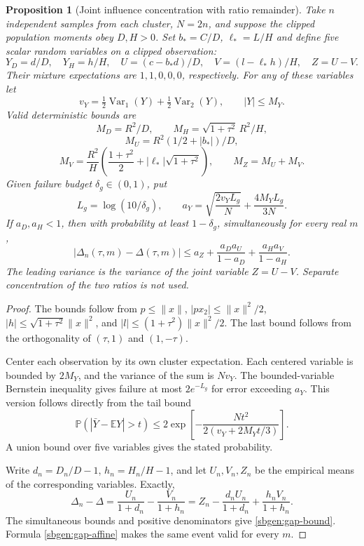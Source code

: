 \documentclass{article} %
\theoremstyle{plain}
\newtheorem{proposition}[theorem]{Proposition}
\theoremstyle{definition}
\theoremstyle{remark}
\begin{document}
\begin{proposition}[Joint influence concentration with ratio remainder]
\label{sbgen:joint-gap}
Take $n$ independent samples from each cluster, $N=2n$, and suppose the
clipped population moments obey $D,H>0$. Set $b_*=C/D$, $\ell_*=L/H$ and
define five scalar random variables on a clipped observation:
\[
 Y_D=d/D,\quad Y_H=h/H,\quad
 U=(c-b_*d)/D,\quad V=(l-\ell_*h)/H,\quad Z=U-V.
\]
Their mixture expectations are $1,1,0,0,0$, respectively. For any of
these variables let
\[
 v_Y=\tfrac12\operatorname{Var}_1(Y)+\tfrac12\operatorname{Var}_2(Y),
 \qquad |Y|\le M_Y.
\]
Valid deterministic bounds are
\[
 M_D=R^2/D,\qquad M_H=\sqrt{1+\tau^2}\,R^2/H,
\]
\[
 M_U=R^2(1/2+|b_*|)/D,
\]
\[
 M_V=\frac{R^2}{H}
       \left(\frac{1+\tau^2}{2}+|\ell_*|\sqrt{1+\tau^2}\right),
 \qquad M_Z=M_U+M_V.
\]
Given failure budget $\delta_g\in(0,1)$, put
\[
 L_g=\log(10/\delta_g),\qquad
 a_Y=\sqrt{\frac{2v_YL_g}{N}}+\frac{4M_YL_g}{3N}.
\]
If $a_D,a_H<1$, then with probability at least $1-\delta_g$,
simultaneously for every real $m$,
\begin{equation}\label{sbgen:gap-bound}
 |\Delta_n(\tau,m)-\Delta(\tau,m)|
 \le a_Z+\frac{a_Da_U}{1-a_D}+\frac{a_Ha_V}{1-a_H}.
\end{equation}
The leading variance is the variance of the \emph{joint} variable
$Z=U-V$. Separate concentration of the two ratios is not used.
\end{proposition}
\begin{proof}
The bounds follow from $p\le\|x\|$, $|px_2|\le\|x\|^2/2$,
$|h|\le\sqrt{1+\tau^2}\|x\|^2$, and
$|l|\le(1+\tau^2)\|x\|^2/2$. The last bound follows from the
orthogonality of $(\tau,1)$ and $(1,-\tau)$.

Center each observation by its own cluster expectation. Each centered
variable is bounded by $2M_Y$, and the variance of the sum is $Nv_Y$.
The bounded-variable Bernstein inequality gives failure at most
$2e^{-L_g}$ for error exceeding $a_Y$. This version follows directly
from the tail bound
\[
 \mathbb P(|\bar Y-\mathbb EY|>t)
 \le2\exp\left[-\frac{Nt^2}{2(v_Y+2M_Yt/3)}\right].
\]
A union bound over five variables gives the stated probability.

Write $d_n=D_n/D-1$, $h_n=H_n/H-1$, and let $U_n,V_n,Z_n$ be the
empirical means of the corresponding variables. Exactly,
\[
 \Delta_n-\Delta
 =\frac{U_n}{1+d_n}-\frac{V_n}{1+h_n}
 =Z_n-\frac{d_nU_n}{1+d_n}+\frac{h_nV_n}{1+h_n}.
\]
The simultaneous bounds and positive denominators give
\eqref{sbgen:gap-bound}. Formula \eqref{sbgen:gap-affine} makes the
same event valid for every $m$.
\end{proof}
\end{document}
